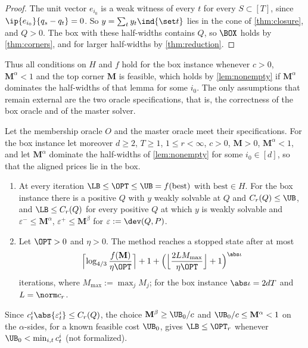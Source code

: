 \begin{proof}
The unit vector $e_{i_0}$ is a weak witness of every $t$ for every $S\subset[T]$, since $\ip{e_{i_0}}{q_s-q_t}=0$. So $y=\sum_ty_t\ind{\set t}$ lies in the cone of \cref{thm:closure}, and $Q>0$. The box with these half-widths contains $Q$, so $\BOX$ holds by \cref{thm:corners}, and for larger half-widths by \cref{thm:reduction}.
\end{proof}

Thus all conditions on $H$ and $f$ hold for the box instance whenever $c>0$, $\mathbf M^\alpha<1$ and the top corner $\mathbf M$ is feasible, which holds by \cref{lem:nonempty} if $\mathbf M^\alpha$ dominates the half-widths of that lemma for some $i_0$. The only assumptions that remain external are the two oracle specifications, that is, the correctness of the box oracle and of the master solver.

\begin{theorem}\label{thm:algo}
Let the membership oracle $O$ and the master oracle meet their specifications. For the box instance let moreover $d\ge2$, $T\ge1$, $1\le r<\infty$, $c>0$, $\mathbf M>0$, $\mathbf M^\alpha<1$, and let $\mathbf M^\alpha$ dominate the half-widths of \cref{lem:nonempty} for some $i_0\in[d]$, so that the aligned prices lie in the box.
\begin{enumerate}[label=(\alph*)]
\item At every iteration $\LB\le\OPT\le\UB=f(\mathrm{best})$ with $\mathrm{best}\in H$. For the box instance there is a positive $Q$ with $y$ weakly solvable at $Q$ and $C_r(Q)\le\UB$, and $\LB\le C_r(Q)$ for every positive $Q$ at which $y$ is weakly solvable and $\varepsilon^-\le\mathbf M^\alpha$, $\varepsilon^+\le\mathbf M^\beta$ for $\varepsilon:=\dev(Q,P)$.
\item Let $\OPT>0$ and $\eta>0$. The method reaches a stopped state after at most
\[
\Bigl\lceil\log_{4/3}\frac{f(\mathbf M)}{\eta\OPT}\Bigr\rceil+1+\Bigl(\Bigl\lfloor\frac{2LM_{\max}}{\eta\OPT}\Bigr\rfloor+1\Bigr)^{\abs\iota}
\]
iterations, where $M_{\max}:=\max_jM_j$; for the box instance $\abs\iota=2dT$ and $L=\norm c_r$.
\end{enumerate}
\end{theorem}
Since $c^i_t\abs{\varepsilon^i_t}\le C_r(Q)$, the choice $\mathbf M^\beta\ge\UB_0/c$ and $\UB_0/c\le\mathbf M^\alpha<1$ on the $\alpha$-sides, for a known feasible cost $\UB_0$, gives $\LB\le\OPT_r$ whenever $\UB_0<\min_{i,t}c^i_t$ (not formalized).

